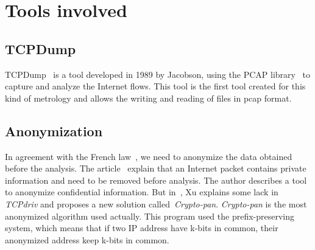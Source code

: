 \documentclass[10pt, conference, a4paper, twocolumns]{IEEEtran}
\def\yassine#1{\textbf{\textcolor{blue}{yassine : #1}}}
\begin{document}
\section{Tools involved}
\label{sec:tools}

\subsection{TCPDump}
\label{subsec:tcpdump}
TCPDump~\cite{TCPDump} is a tool developed in 1989 by Jacobson, using the PCAP library~\cite{PCAP2001} to capture and analyze the Internet flows. This tool is the first tool created for this kind of metrology and allows the writing and reading of files in pcap format.

\subsection{Anonymization}
In agreement with the French law~\cite{LIL1978}, we need to anonymize the data obtained before the analysis.
The article~\cite{Minshall2005tcpdpriv} explain that an Internet packet contains private information and need to be removed before analysis. The author describes a tool to anonymize confidential information.
But in~\cite{Xu2002}, Xu explains %
some lack %
in \emph{TCPdriv} and proposes a new solution called~\emph{Crypto-pan}. \emph{Crypto-pan} is the most anonymized algorithm used actually. This program used the prefix-preserving system, which means that if two IP address have k-bits in common, their anonymized address keep k-bits in common.
\end{document}
